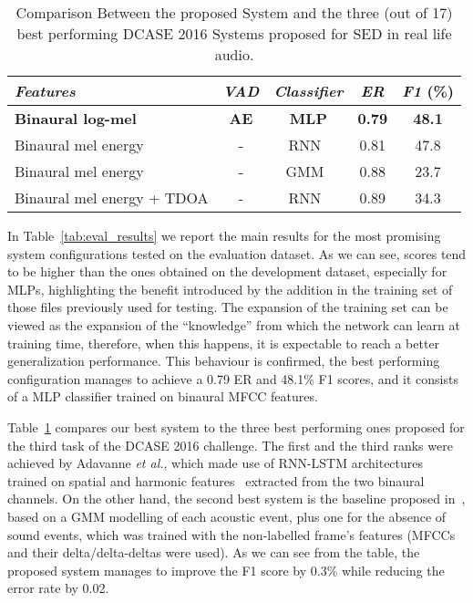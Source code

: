\begin{table}
	\caption{Comparison Between the proposed System and the three (out of 17) best performing DCASE 2016 Systems proposed for SED in real life audio.}
	\label{tab:challenge_results}
	\centering
	\begin{tabular}{l c c c c}\toprule
		\emph{Features} & \emph{VAD} & \emph{Classifier} & \emph{ER} & \emph{F1} (\%)\\
		\midrule
		\textbf{Binaural log-mel} & \textbf{AE} & \textbf{MLP} & \textbf{0.79} & \textbf{48.1}\\
		\midrule
		Binaural mel energy & - & RNN~\cite{adavanne2016sound} & 0.81 & 47.8\\
		Binaural mel energy & - & GMM~\cite{mesaros2016tut} & 0.88 & 23.7\\
		Binaural mel energy + TDOA & - & RNN~\cite{adavanne2016sound} & 0.89 & 34.3\\
		\bottomrule
	\end{tabular}
\end{table}

In Table~\ref{tab:eval_results} we report the main results for the most promising system configurations tested on the evaluation dataset. As we can see, scores tend to be higher than the ones obtained on the development dataset, especially for MLPs, highlighting the benefit introduced by the addition in the training set of those files previously used for testing. The expansion of the training set can be viewed as the expansion of the ``knowledge'' from which the network can learn at training time, therefore, when this happens, it is expectable to reach a better generalization performance. This behaviour is confirmed, the best performing configuration manages to achieve a 0.79 ER and 48.1\% F1 scores, and it consists of a MLP classifier trained on binaural MFCC features.

Table~\ref{tab:challenge_results} compares our best system to the three best performing ones proposed for the third task of the DCASE 2016 challenge. The first and the third ranks were achieved by Adavanne \emph{et al.}, which made use of RNN-LSTM architectures trained on spatial and harmonic features~\cite{adavanne2016sound} extracted from the two binaural channels. On the other hand, the second best system is the baseline proposed in~\cite{mesaros2016tut}, based on a GMM modelling of each acoustic event, plus one for the absence of sound events, which was trained with the non-labelled frame's features (MFCCs and their delta/delta-deltas were used). As we can see from the table, the proposed system manages to improve the F1 score by 0.3\% while reducing the error rate by 0.02.

